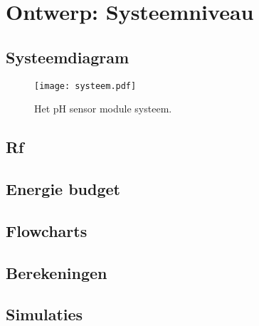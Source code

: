 \section{Ontwerp: Systeemniveau}
\subsection{Systeemdiagram}
\begin{figure}[ht]
    \centering
    \texttt{[image: systeem.pdf]}
    \caption[short]{Het pH sensor module systeem.}
    \label{fig:functional}
\end{figure}


\subsection{Rf}


\subsection{Energie budget}

\subsection{Flowcharts}
\subsection{Berekeningen}
\subsection{Simulaties}




%
